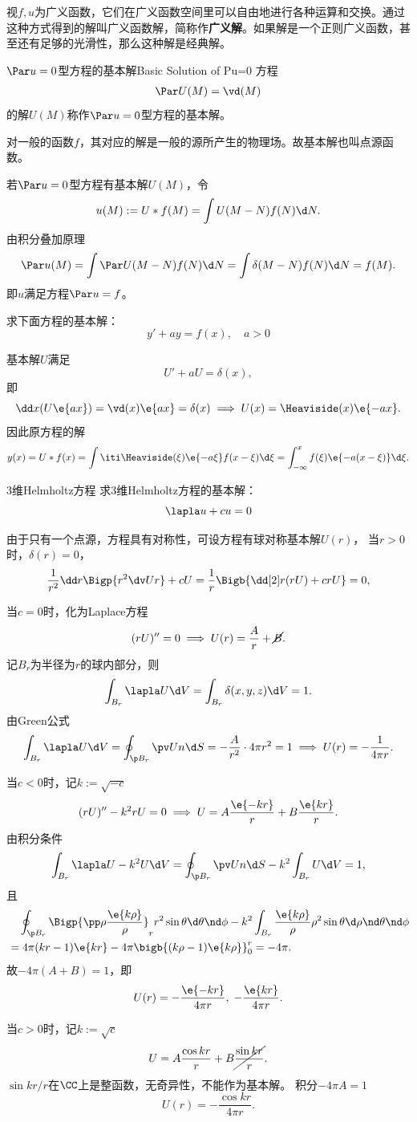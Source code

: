 视$f,u$为广义函数，它们在广义函数空间里可以自由地进行各种运算和交换。通过这种方式得到的解叫广义函数解，简称作\textbf{广义解}。如果解是一个正则广义函数，甚至还有足够的光滑性，那么这种解是经典解。
\begin{definition}{$\Par u=0$型方程的基本解}{Basic Solution of Pu=0}
	方程
	\begin{align}
		\Par U(M)=\vd(M)
	\end{align}
	的解$U(M)$称作$\Par u=0$型方程的基本解。
\end{definition}
对一般的函数$f$，其对应的解是一般的源所产生的物理场。故基本解也叫点源函数。

若$\Par u=0$型方程有基本解$U(M)$，令
\begin{align}
	u(M):=U\ast f(M)=\int U(M-N)f(N)\d N.
\end{align}
由积分叠加原理
\[
	\Par u(M)=\int\Par U(M-N)f(N)\d N=\int\delta(M-N)f(N)\d N=f(M).
\]
即$u$满足方程$\Par u=f$。
\begin{example}{}{}
	求下面方程的基本解：
	\[
		y'+ay=f(x),\quad a>0
	\]
	
	基本解$U$满足
	\[
		U'+aU=\delta(x),
	\]
	即
	\[
		\dd x(U\e{ax})=\vd(x)\e{ax}=\delta(x)\implies U(x)=\Heaviside(x)\e{-ax}.
	\]
	因此原方程的解
	\[
		y(x)=U\ast f(x)=\int\iti\Heaviside(\xi)\e{-a\xi}f(x-\xi)\d\xi=\int_{-\infty}^xf(\xi)\e{-a(x-\xi)}\d\xi.
	\]
\end{example}
\begin{example}{3维Helmholtz方程}{}
	求3维Helmholtz方程的基本解：
	\[
		\lapla u+cu=0
	\]
	
	由于只有一个点源，方程具有对称性，可设方程有球对称基本解$U(r)$，
	当$r>0$时，$\delta(r)=0$，
	\[
		\frac1{r^2}\dd r\Bigp{r^2\dv Ur}+cU=\frac1r\Bigb{\dd[2]r(rU)+crU}=0,
	\]
	
	当$c=0$时，化为Laplace方程
	\[
		(rU)''=0\implies U(r)=\frac Ar+\cancel{B}.
	\]
	记$B_r$为半径为$r$的球内部分，则
	\[
		\int_{B_r}\lapla U\d V=\int_{B_r}\delta(x,y,z)\d V=1.
	\]
	由Green公式
	\[
		\int_{B_r}\lapla U\d V=\oint_{\p B_r}\pv Un\d S=-\frac A{r^2}\cdot 4\pi r^2=1\implies U(r)=-\frac1{4\pi r}.
	\]
	
	当$c<0$时，记$k:=\sqrt{-c}$
	\[
		(rU)''-k^2rU=0\implies U=A\frac{\e{-kr}}r+B\frac{\e{kr}}r.
	\]
	由积分条件
	\[
		\int_{B_r}\lapla U-k^2U\d V=\oint_{\p B_r}\pv Un\d S-k^2\int_{B_r}U\d V=1,
	\]
	且
	\begin{align*}
		&\quad\oint_{\p B_r}\Bigp{\pp\rho\frac{\e{k\rho}}\rho}_rr^2\sin\theta\d\theta\nd\phi-k^2\int_{B_r}\frac{\e{k\rho}}\rho\rho^2\sin\theta\d\rho\nd\theta\nd\phi\\
		&=4\pi(kr-1)\e{kr}-4\pi\bigb{(k\rho-1)\e{k\rho}}_0^r=-4\pi.
	\end{align*}
	故$-4\pi(A+B)=1$，即
	\[
		U(r)=-\frac{\e{-kr}}{4\pi r},\;-\frac{\e{kr}}{4\pi r}.
	\]
	
	当$c>0$时，记$k:=\sqrt c$
	\[
		U=A\frac{\cos kr}r+B\cancel{\frac{\sin kr}r}.
	\]
	$\sin kr/r$在$\CC$上是整函数，无奇异性，不能作为基本解。
	积分$-4\pi A=1$
	\[
		U(r)=-\frac{\cos kr}{4\pi r}.
	\]
\end{example}
